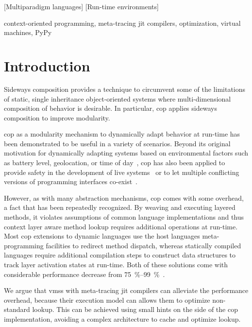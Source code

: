 \documentclass[preprint,english,10pt,nonatbib]{sigplanconf}
\begin{document}
[Mul\-ti\-par\-a\-digm languages]
[Run-time environments]

\keywords
context-oriented programming,
meta-tracing \acs{jit} compilers,
optimization,
virtual machines,
PyPy

\section{Introduction}

Sideways composition provides a technique to circumvent some of the limitations
of static, single inheritance object-oriented systems where multi-dimensional
composition of behavior is desirable. In particular, \acrlong{cop} applies
sideways composition to improve modularity.

\ac{cop} as a modularity mechanism to dynamically adapt behavior at run-time has
been demonstrated to be useful in a variety of scenarios. Beyond its original
motivation for dynamically adapting systems based on environmental factors such
as battery level, geolocation, or time of day~, \ac{cop} has also
been applied to provide safety in the development of live
systems~\cite{lincke+:2012:scoping-changes} or to let multiple conflicting
versions of programming interfaces co-exist~.

However, as with many abstraction mechanisms, \ac{cop} comes with some overhead,
a fact that has been repeatedly recognized. By weaving and executing layered
methods, it violates assumptions of common language implementations and thus
context layer aware method lookup requires additional operations at
run-time. Most \ac{cop} extensions to dynamic languages use the host languages
meta-programming facilities to redirect method dispatch, whereas statically
compiled languages require additional compilation steps to construct data
structures to track layer activation states at run-time. Both of these solutions
come with considerable performance decrease from
\SIrange{75}{99}{\percent}~\cite{appeltauer+:2009:comparison-context-oriented}.

We argue that \acp{vms} with meta-tracing \ac{jit} compilers can alleviate the
performance overhead, because their execution model can allows them to optimize
non-standard lookup. This can be achieved using small hints on the side of the
\ac{cop} implementation, avoiding a complex architecture to cache and optimize
lookup.
\end{document}
